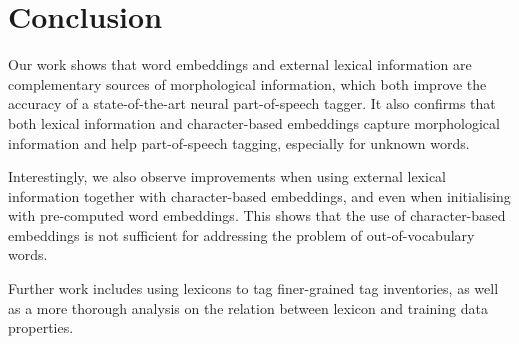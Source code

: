 \documentclass[11pt,a4paper]{article}
\begin{document}
\section{Conclusion}

Our work shows that word embeddings and external lexical information are complementary sources of morphological
information, which both improve the accuracy of a state-of-the-art neural part-of-speech tagger. It also confirms that
both lexical information and character-based embeddings capture morphological information and help part-of-speech
tagging, especially for unknown words.

Interestingly, we also observe improvements when using external lexical information together with character-based
embeddings, and even when initialising with pre-computed word embeddings. This shows that the use of character-based
embeddings is not sufficient for addressing the problem of out-of-vocabulary words.

Further work includes using lexicons to tag finer-grained tag inventories, as well as a more thorough analysis on the
relation between lexicon and training data properties.






\end{document}
